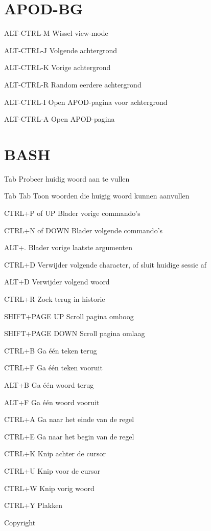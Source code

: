 \documentclass[10pt]{article}
\begin{document}
\begin{multicols}{3}
	\section{APOD-BG}
	\begin{ttdesc}[labelwidth=\widthof{\texttt{WIN-SHIFT+E}}]
	\item[ALT-CTRL-M] Wissel view-mode
	\item[ALT-CTRL-J] Volgende achtergrond
	\item[ALT-CTRL-K] Vorige achtergrond
	\item[ALT-CTRL-R] Random eerdere achtergrond
	\item[ALT-CTRL-I] Open APOD-pagina voor achtergrond
	\item[ALT-CTRL-A] Open APOD-pagina
	\end{ttdesc}

	\section{BASH}
	\begin{ttdesc}[labelwidth=\widthof{\texttt{Tab Tab}}]
	\item[Tab] Probeer huidig woord aan te vullen
	\item[Tab Tab] Toon woorden die huigig woord kunnen aanvullen
	\item[CTRL+P of UP] Blader vorige commando's
	\item[CTRL+N of DOWN] Blader volgende commando's
	\item[ALT+.] Blader vorige laatste argumenten
	\item[CTRL+D] Verwijder volgende character, of sluit huidige sessie af
	\item[ALT+D] Verwijder volgend woord
	\item[CTRL+R] Zoek terug in historie
	\item[SHIFT+PAGE UP] Scroll pagina omhoog
	\item[SHIFT+PAGE DOWN] Scroll pagina omlaag
	\item[CTRL+B] Ga \'{e}\'{e}n teken terug
	\item[CTRL+F] Ga \'{e}\'{e}n teken vooruit
	\item[ALT+B] Ga \'{e}\'{e}n woord terug
	\item[ALT+F] Ga \'{e}\'{e}n woord vooruit
	\item[CTRL+A] Ga naar het einde van de regel
	\item[CTRL+E] Ga naar het begin van de regel
	\item[CTRL+K] Knip achter de cursor 
	\item[CTRL+U] Knip voor de cursor 
	\item[CTRL+W] Knip vorig woord 
	\item[CTRL+Y] Plakken 
	\end{ttdesc}


	\noindent Copyright \textcopyright{} \thedate{} \theauthor{}

\end{multicols}
\end{document}
